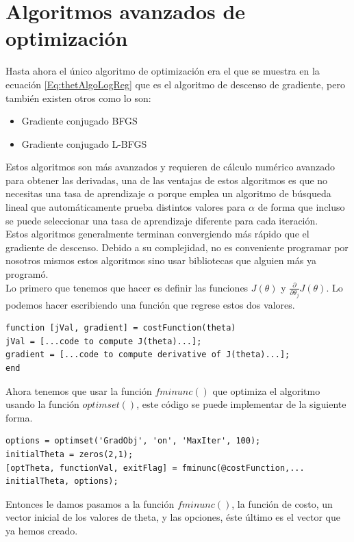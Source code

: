 \documentclass{report}
\begin{document}
\section{Algoritmos avanzados de optimización}
Hasta ahora el único algoritmo de optimización era el que se muestra en la ecuación \ref{Eq:thetAlgoLogReg} que es el algoritmo de descenso de gradiente, pero también existen otros como lo son:
\begin{itemize}
	\item Gradiente conjugado BFGS
	\item Gradiente conjugado L-BFGS
\end{itemize}
Estos algoritmos son más avanzados y requieren de cálculo numérico avanzado para obtener las derivadas, una de las ventajas de estos algoritmos es que no necesitas una tasa de aprendizaje $ \alpha $ porque emplea un algoritmo de búsqueda lineal que automáticamente prueba distintos valores para $ \alpha $ de forma que incluso se puede seleccionar una tasa de aprendizaje diferente para cada iteración.\\Estos algoritmos generalmente terminan convergiendo más rápido que el gradiente de descenso. Debido a su complejidad, no es conveniente programar por nosotros mismos estos algoritmos sino usar bibliotecas que alguien más ya programó.\\Lo primero que tenemos que hacer es definir las funciones $ J(\theta) $ y $ \frac{\partial}{\partial\theta_j}J(\theta) $. Lo podemos hacer escribiendo una función que regrese estos dos valores.
\begin{lstlisting}[frame=single]
function [jVal, gradient] = costFunction(theta)
jVal = [...code to compute J(theta)...];
gradient = [...code to compute derivative of J(theta)...];
end
\end{lstlisting}
Ahora tenemos que usar la función $ fminunc() $ que optimiza el algoritmo usando la función $ optimset() $, este código se puede implementar de la siguiente forma.
\begin{lstlisting}[frame=single,numbers=none]
options = optimset('GradObj', 'on', 'MaxIter', 100);
initialTheta = zeros(2,1);
[optTheta, functionVal, exitFlag] = fminunc(@costFunction,...
initialTheta, options);
\end{lstlisting}
Entonces le damos pasamos a la función $ fminunc() $, la función de costo, un vector inicial de los valores de theta, y las opciones, éste último es el vector que ya hemos creado.
\end{document}
